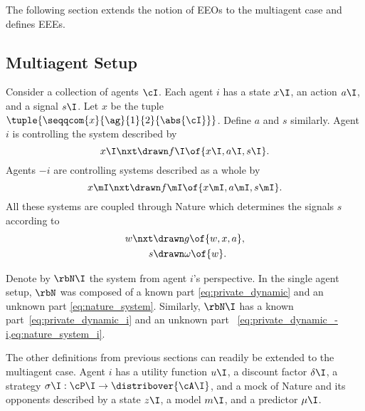 The following section extends the notion of EEOs to the multiagent case and defines EEEs.

\subsection{Multiagent Setup}

Consider a collection of agents \(\cI\).
Each agent \(i\) has a state \(x\I\), an action \(a\I\), and a signal \(s\I\).
Let \(x\) be the tuple \(\tuple{\seqqcom{x}{\ag}{1}{2}{\abs{\cI}}}\).
Define \(a\) and \(s\) similarly.
Agent \(i\) is controlling the system described by
\begin{equation}
\label{eq:private_dynamic_i}
x\I\nxt \drawn  f\I \of{x\I, a\I, s\I}.
\end{equation}
Agents \(-i\) are controlling systems described as a whole by
\begin{equation}
\label{eq:private_dynamic_-i}
x\mI\nxt \drawn  f\mI \of{x\mI, a\mI, s\mI}.
\end{equation}
All these systems are coupled through Nature which determines the signals \(s\) according to
\begin{subequations}
\label{eq:nature_system_i}
\begin{align}
\label{eq:nature_dynamic_i}
w\nxt &\drawn g \of{w, x, a}, \\
\label{eq:nature_signal_i}
s &\drawn \omega \of{w}.
\end{align}
\end{subequations}

Denote by \(\rbN\I\) the system from agent \(i\)'s perspective.
In the single agent setup, \(\rbN\) was composed of a known part \cref{eq:private_dynamic} and an unknown part \cref{eq:nature_system}.
Similarly, \(\rbN\I\) has a known part~\cref{eq:private_dynamic_i} and an unknown part~ \cref{eq:private_dynamic_-i,eq:nature_system_i}.

The other definitions from previous sections can readily be extended to the multiagent case.
Agent \(i\) has a utility function \(u\I\), a discount factor \(\delta\I\), a strategy \(\sigma\I : \cP\I \to \distribover{\cA\I}\), and a mock of Nature and its opponents described by a state \(z\I\), a model \(m\I\), and a predictor \(\mu\I\).

